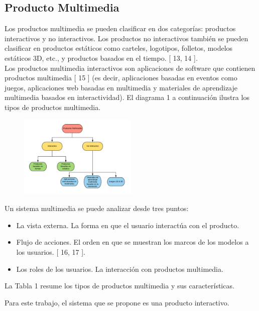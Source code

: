 \subsection{Producto Multimedia}
Los productos multimedia se pueden clasificar en dos categorías: productos interactivos y no interactivos. Los productos no interactivos también se pueden clasificar en productos estáticos como carteles, logotipos, folletos, modelos estáticos 3D, etc., y productos basados en el tiempo. [ 13, 14 ].\\ 
\newline
Los productos multimedia interactivos son aplicaciones de software que contienen productos multimedia [ 15 ] (es decir, aplicaciones basadas en eventos como juegos, aplicaciones web basadas en multimedia y materiales de aprendizaje multimedia basados en interactividad).  El diagrama 1 a continuación ilustra los tipos de productos multimedia.\\
\newline
\begin{figure}[H]
	\begin{center}
 		\includegraphics[width = 0.5\textwidth]{source/images/image52.png}
	\end{center} 
\end{figure}

Un sistema multimedia se puede analizar desde tres puntos:
\begin{itemize}
\item La vista externa. La forma en que el usuario interactúa con el producto.
\item Flujo de acciones. El orden en que se muestran los marcos de los modelos a los usuarios. [ 16, 17 ].
\item  Los roles de los usuarios. La interacción con productos multimedia.
\end{itemize} 
La Tabla 1 resume los tipos de productos multimedia y sus características.


Para este trabajo, el sistema que se propone es una producto interactivo.
